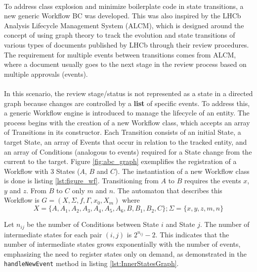 \paragraph{} To address class explosion and minimize boilerplate code in state transitions, a new generic Workflow BC was developed. This was also inspired by the LHCb Analysis Lifecycle Management System (ALCM), which is designed around the concept of using graph theory to track the evolution and state transitions of various types of documents published by LHCb through their review procedures. The requirement for multiple events between transitions comes from ALCM, where a document usually goes to the next stage in the review process based on multiple approvals (events).

\paragraph{} In this scenario, the review stage/status is not represented as a state in a directed graph because changes are controlled by a \textbf{list} of specific events. To address this, a generic Workflow engine is introduced to manage the lifecycle of an entity. The process begins with the creation of a new Workflow class, which accepts an array of Transitions in its constructor. Each Transition consists of an initial State, a target State, an array of Events that occur in relation to the tracked entity, and an array of Conditions (analogous to events) required for a State change from the current to the target. Figure \ref{fig:abc_graph} exemplifies the registration of a Workflow with 3 States ($A$, $B$ and $C$). The instantiation of a new Workflow class is done is listing \ref{lst:figure_wf}. Transitioning from $A$ to $B$ requires the events $x$, $y$ and $z$. From $B$ to $C$ only $m$ and $n$. The automaton that describes this Workflow is $ G=(X, \Sigma, f, \Gamma, x_0, X_m)$ where
$$
X=\{A, A_1, A_2, A_3, A_4, A_5, A_6, B, B_1, B_2, C\}; \Sigma=\{x, y, z, m, n\}
$$

\noindent
Let $n_{i j}$ be the number of Conditions between State $i$ and State $j$. The number of intermediate states for each pair $(i, j)$ is $2^{n_{i j}}-2$. This indicates that the number of intermediate states grows exponentially with the number of events, emphasizing the need to register states only on demand, as demonstrated in the \verb|handleNewEvent| method in listing \ref{lst:InnerStatesGraph}.


